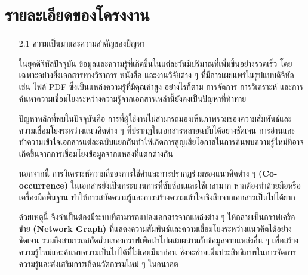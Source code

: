 \documentclass[12pt,a4paper]{article}
\newcommand{\textlight}[1]{{\thailightfont #1}}
\begin{document}
\section{รายละเอียดของโครงงาน}
\begin{enumerate}[leftmargin=2cm]
\small
    \item[2.1] ความเป็นมาและความสำคัญของปัญหา
    \vspace{0.35cm}
    \\
    \textlight{
        \hspace{1cm}ในยุคดิจิทัลปัจจุบัน ข้อมูลและความรู้ที่เกิดขึ้นในแต่ละวันมีปริมาณที่เพิ่มขึ้นอย่างรวดเร็ว โดยเฉพาะอย่างยิ่งเอกสารทางวิชาการ หนังสือ และงานวิจัยต่าง ๆ ที่มีการเผยแพร่ในรูปแบบดิจิทัล เช่น ไฟล์ PDF ซึ่งเป็นแหล่งความรู้ที่มีคุณค่าสูง อย่างไรก็ตาม การจัดการ การวิเคราะห์ และการค้นหาความเชื่อมโยงระหว่างความรู้จากเอกสารเหล่านี้ยังคงเป็นปัญหาที่ท้าทาย

        \hspace{1cm}ปัญหาหลักที่พบในปัจจุบันคือ การที่ผู้ใช้งานไม่สามารถมองเห็นภาพรวมของความสัมพันธ์และความเชื่อมโยงระหว่างแนวคิดต่าง ๆ ที่ปรากฏในเอกสารหลายฉบับได้อย่างชัดเจน การอ่านและทำความเข้าใจเอกสารแต่ละฉบับแยกกันทำให้เกิดการสูญเสียโอกาสในการค้นพบความรู้ใหม่ที่อาจเกิดขึ้นจากการเชื่อมโยงข้อมูลจากแหล่งที่แตกต่างกัน

        \hspace{1cm}นอกจากนี้ การวิเคราะห์ความถี่ของการใช้คำและการปรากฏร่วมของแนวคิดต่าง ๆ \textbf{(Co-occurrence)} ในเอกสารยังเป็นกระบวนการที่ซับซ้อนและใช้เวลามาก หากต้องทำด้วยมือหรือเครื่องมือพื้นฐาน ทำให้การสกัดความรู้และการสร้างความเข้าใจเชิงลึกจากเอกสารเป็นไปได้ยาก

        \hspace{1cm}ด้วยเหตุนี้ จึงจำเป็นต้องมีระบบที่สามารถแปลงเอกสารจากแหล่งต่าง ๆ ให้กลายเป็นกราฟเครือข่าย \textbf{(Network Graph)} ที่แสดงความสัมพันธ์และความเชื่อมโยงระหว่างแนวคิดได้อย่างชัดเจน รวมถึงสามารถสกัดส่วนของกราฟเพื่อนำไปผสมผสานกับข้อมูลจากแหล่งอื่น ๆ เพื่อสร้างความรู้ใหม่และค้นพบความเป็นไปได้ที่ไม่เคยมีมาก่อน ซึ่งจะช่วยเพิ่มประสิทธิภาพในการจัดการความรู้และส่งเสริมการเกิดนวัตกรรมใหม่ ๆ ในอนาคต
    }


\end{enumerate}
\end{document}
